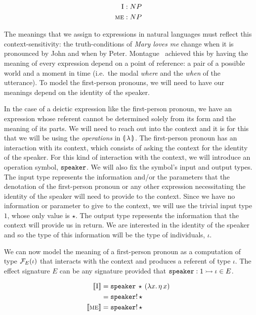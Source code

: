 \begin{align*}
\textsc{I} &: NP \\
\textsc{me} &: NP
\end{align*}

The meanings that we assign to expressions in natural languages must
reflect this context-sensitivity: the truth-conditions of \emph{Mary loves
  me} change when it is pronounced by John and when by
Peter. Montague~\cite{montague1973proper} achieved this by having the
meaning of every expression depend on a point of reference: a pair of a
possible world and a moment in time (i.e.\ the modal \emph{where} and the
\emph{when} of the utterance). To model the first-person pronouns, we will
need to have our meanings depend on the identity of the speaker.

In the case of a deictic expression like the first-person pronoun, we have
an expression whose referent cannot be determined solely from its form and
the meaning of its parts. We will need to reach out into the context and it
is for this that we will be using the \emph{operations} in
$\llparenthesis \, \lambda \, \rrparenthesis$. The first-person pronoun has an interaction with its
context, which consists of asking the context for the identity of the
speaker. For this kind of interaction with the context, we will introduce
an operation symbol, $\mathtt{speaker}$. We will also fix the symbol's input
and output types. The input type represents the information and/or the
parameters that the denotation of the first-person pronoun or any other
expression necessitating the identity of the speaker will need to provide
to the context. Since we have no information or parameter to give to the
context, we will use the trivial input type $1$, whose only value is
$\star$. The output type represents the information that the context will
provide us in return. We are interested in the identity of the speaker and
so the type of this information will be the type of individuals, $\iota$.

We can now model the meaning of a first-person pronoun as a computation of
type $\mathcal{F}_E(\iota)$ that interacts with the context and produces a referent
of type $\iota$. The effect signature $E$ can be any signature provided
that $\mathtt{speaker} : 1 \rightarrowtail \iota \in E$.

\begin{align*}
  \llbracket \textsc{I} \rrbracket &= \mathtt{speaker}\,\star\,(\lambda x.\, \eta\,x) \\
  &= \mathtt{speaker}!\,\star \\
  \llbracket \textsc{me} \rrbracket &= \mathtt{speaker}!\,\star
\end{align*}

